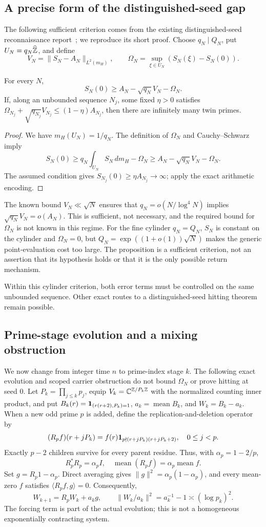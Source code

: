 \subsection{A precise form of the distinguished-seed gap}
The following sufficient criterion comes from the existing distinguished-seed reconnaissance report~\cite{archiveseed}; we reproduce its short proof.
Choose $q_N\mid Q_N$, put $U_N=q_N\widehat{\mathbb Z}$, and define
\[
V_N=\|S_N-A_N\|_{L^2(m_H)},\qquad
\Omega_N=\sup_{\xi\in U_N}(S_N(\xi)-S_N(0)).
\]
\begin{proposition}\label{prop:seed}
For every $N$,
\[
S_N(0)\ge A_N-\sqrt{q_N}V_N-\Omega_N.
\]
If, along an unbounded sequence $N_j$, some fixed $\eta>0$ satisfies
$\Omega_{N_j}+\sqrt{q_{N_j}}V_{N_j}\le(1-\eta)A_{N_j}$, then there are infinitely many twin primes.
\end{proposition}
\begin{proof}
We have $m_H(U_N)=1/q_N$. The definition of $\Omega_N$ and Cauchy--Schwarz imply
\[
S_N(0)\ge q_N\int_{U_N}S_N\,dm_H-\Omega_N
\ge A_N-\sqrt{q_N}V_N-\Omega_N.
\]
The assumed condition gives $S_{N_j}(0)\ge\eta A_{N_j}\to\infty$; apply the exact arithmetic encoding.
\end{proof}
The known bound $V_N\ll\sqrt N$ ensures that $q_N=o(N/\log^4N)$ implies
$\sqrt{q_N}V_N=o(A_N)$. This is sufficient, not necessary, and the required bound for $\Omega_N$ is not known in this regime.
For the fine cylinder $q_N=Q_N$, $S_N$ is constant on the cylinder and $\Omega_N=0$, but
$Q_N=\exp((1+o(1))\sqrt N)$ makes the generic point-evaluation cost too large.
The proposition is a sufficient criterion, not an assertion that its hypothesis holds or that it is the only possible return mechanism.

Within this cylinder criterion, both error terms must be controlled on the same unbounded sequence. Other exact routes to a distinguished-seed hitting theorem remain possible.

\subsection{Prime-stage evolution and a mixing obstruction}
We now change from integer time $n$ to prime-index stage $k$. The following exact evolution and scoped carrier obstruction do not bound $\Omega_N$ or prove hitting at seed $0$.
Let $P_k=\prod_{j\le k}p_j$, equip $V_k=\mathbb C^{\mathbb Z/P_k\mathbb Z}$ with the normalized counting inner product, and put
$B_k(r)=\mathbf 1_{(r(r+2),P_k)=1}$, $a_k=\operatorname{mean}B_k$, and $W_k=B_k-a_k$.
When a new odd prime $p$ is added, define the replication-and-deletion operator by
\[
(R_pf)(r+jP_k)=f(r)\mathbf 1_{p\nmid(r+jP_k)(r+jP_k+2)},\quad 0\le j<p.
\]
Exactly $p-2$ children survive for every parent residue. Thus, with $\alpha_p=1-2/p$,
\[
R_p^*R_p=\alpha_p I,\quad \operatorname{mean}(R_pf)=\alpha_p\operatorname{mean}f.
\]
Set $g=R_p1-\alpha_p$. Direct averaging gives $\|g\|^2=\alpha_p(1-\alpha_p)$, and every mean-zero $f$ satisfies $\langle R_pf,g\rangle=0$. Consequently,
\[
W_{k+1}=R_pW_k+a_kg,\qquad \|W_k/a_k\|^2=a_k^{-1}-1\asymp(\log p_k)^2.
\]
The forcing term is part of the actual evolution; this is not a homogeneous exponentially contracting system.

